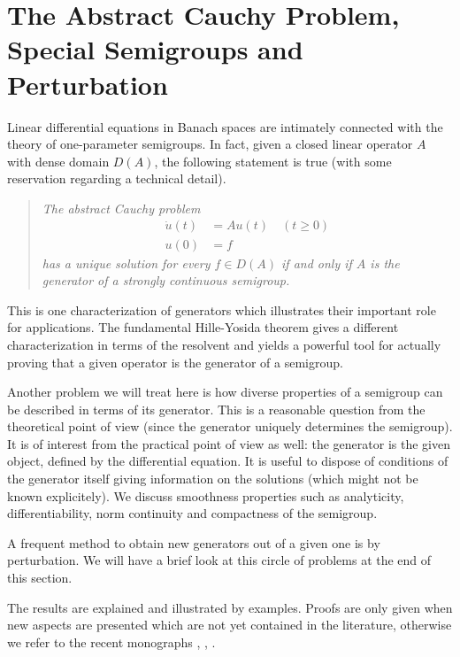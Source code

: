 \section{The Abstract Cauchy Problem, Special Semigroups and Perturbation} \label{sec:a2-1}%
\hspace{1cm}{\Large by Wolfgang Arendt}
\vspace{.5cm}
\newline
Linear differential equations in Banach spaces are intimately connected with the theory of one-parameter semigroups.
In fact, given a closed linear operator $A$ with dense domain $D(A)$, the following statement is true (with some reservation regarding a technical detail).
\begin{quote}
\textit{The abstract Cauchy problem}
\begin{align*}
	\dot{u}(t) &= Au(t) \quad (t \geq 0) \\
	u(0) &= f 
\end{align*}
\textit{has a unique solution for every $f \in D(A)$ if and only if\/ $A$ is the generator of a strongly continuous semigroup.}
\end{quote}
This is one characterization of generators which illustrates their important role for applications.
The fundamental Hille-Yosida theorem gives a different characterization in terms of the resolvent and yields a powerful tool for actually proving that a given operator is the generator of a semigroup.

Another problem we will treat here is how diverse properties of a semigroup can be described in terms of its generator.
This is a reasonable question from the theoretical point of view (since the generator uniquely determines the semigroup).
It is of interest from the practical point of view as well: the generator is the given object, defined by the differential equation.
It is useful to dispose of conditions of the generator itself giving information on the solutions (which might not be known explicitely).
We discuss smoothness properties such as analyticity, differentiability, norm continuity and compactness of the semigroup.

A frequent method to obtain new generators out of a given one is by perturbation.
We will have a brief look at this circle of problems at the end of this section.

The results are explained and illustrated by examples.
Proofs are only given when new aspects are presented which are not yet contained in the literature, otherwise we refer to the recent monographs \textcite{davies:1980}, \textcite{goldstein:1985a}, \textcite{pazy:1983}.
